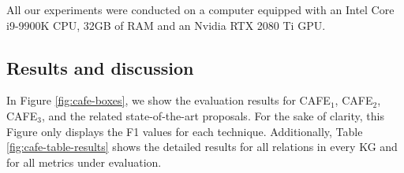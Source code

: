 All our experiments were conducted on a computer equipped with an Intel Core i9-9900K CPU, 32GB of RAM and an Nvidia RTX 2080 Ti GPU.

\subsection{Results and discussion}
In Figure \ref{fig:cafe-boxes}, we show the evaluation results for CAFE$_1$, CAFE$_2$, CAFE$_3$, and the related state-of-the-art proposals. For the sake of clarity, this Figure only displays the F1 values for each technique. Additionally, Table \ref{fig:cafe-table-results} shows the detailed results for all relations in every KG and for all metrics under evaluation.

\begin{figure}[!htp]
    \centering
    \def\subfigscale{0.6\textwidth}
    

\end{figure}
